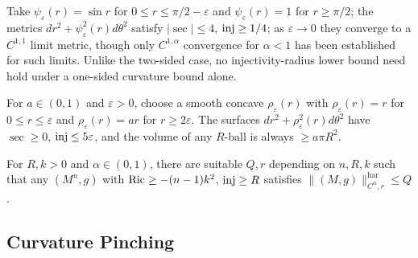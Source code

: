\begin{example}
  \label{ex:pet-ch11-c11-limit-example}

  Take $\psi_\varepsilon(r)=\sin r$ for $0\le r\le\pi/2-\varepsilon$ and
  $\psi_\varepsilon(r)=1$ for $r\ge\pi/2$; the metrics
  $dr^2+\psi_\varepsilon^2(r)d\theta^2$ satisfy $|\sec|\le4$, $\operatorname{inj}\ge1/4$; as
  $\varepsilon\to0$ they converge to a $C^{1,1}$ limit metric, though only
  $C^{1,\alpha}$ convergence for $\alpha<1$ has been established for such
  limits. Unlike the two-sided case, no injectivity-radius lower bound need
  hold under a one-sided curvature bound alone.
\end{example}

\begin{remark}
  \label{rem:pet-ch11-exercise-11-4-14}

  For $a\in(0,1)$ and $\varepsilon>0$, choose a smooth concave
  $\rho_\varepsilon(r)$ with $\rho_\varepsilon(r)=r$ for $0\le r\le\varepsilon$
  and $\rho_\varepsilon(r)=ar$ for $r\ge2\varepsilon$. The surfaces
  $dr^2+\rho_\varepsilon^2(r)d\theta^2$ have $\sec\ge0$, $\operatorname{inj}\le5\varepsilon$,
  and the volume of any $R$-ball is always $\ge a\pi R^2$.
\end{remark}

\begin{theorem}
  \label{thm:pet-ch11-anderson-cheeger-ricci-lower-bound-norm}

  For $R,k>0$ and $\alpha\in(0,1)$, there are suitable $Q,r$ depending on
  $n,R,k$
  such that any $(M^n,g)$ with $\operatorname{Ric}\ge-(n-1)k^2$, $\operatorname{inj}\ge R$ satisfies
  $\|(M,g)\|^{\mathrm{har}}_{C^{\alpha},r}\le Q$.
\end{theorem}

\subsection{Curvature Pinching}

